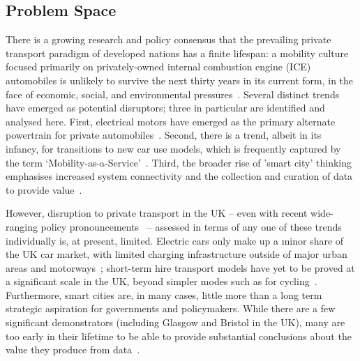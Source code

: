 \documentclass[b5paper,10pt]{article}
\begin{document}
\subsection{Problem Space}

There is a growing research and policy consensus that the prevailing
private transport paradigm of developed nations has a finite lifespan:
a mobility culture focused primarily on privately-owned internal
combustion engine (ICE) automobiles is unlikely to survive the next
thirty years in its current form, in the face of economic, social, and
environmental
pressures~\citep{lerner:2011,van-audenhove-et-al:2014,black-et-al:2016}.
Several distinct trends have emerged as potential disruptors; three in
particular are identified and analysed here. First, electrical motors
have emerged as the primary alternate powertrain for private
automobiles~\citep{paffumi-et-al:2015,gnann-et-al:2015}.  Second,
there is a trend, albeit in its infancy, for transitions to new car
use models, which is frequently captured by the term
`Mobility-as-a-Service'~\citep{tscatapult:2016}. Third, the broader
rise of 'smart city' thinking emphasises increased system connectivity
and the collection and curation of data to provide
value~\citep{townsend:2013,cosgrave-et-al:2013,ibm:2014}.

However, disruption to private transport in the UK -- even with recent
wide-ranging policy pronouncements~\citep{bbcnews:2017} -- assessed in
terms of any one of these trends individually is, at present,
limited. Electric cars only make up a minor share of the UK car
market, with limited charging infrastructure outside of major urban
areas and motorways~\citep{brook:2015}; short-term hire transport
models have yet to be proved at a significant scale in the UK, beyond
simpler modes such as for
cycling~\citep{kamargianni-et-al:2016}. Furthermore, smart cities are,
in many cases, little more than a long term strategic aspiration for
governments and policymakers. While there are a few significant
demonstrators (including Glasgow and Bristol in the UK), many are too
early in their lifetime to be able to provide substantial conclusions
about the value they produce from
data~\citep{ojo-et-al:2015,sta:2017}.
\end{document}
